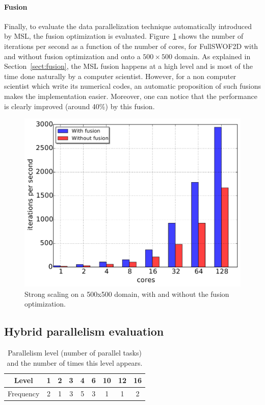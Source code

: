 \paragraph{\textbf{Fusion}} Finally, to evaluate the data parallelization technique automatically introduced by MSL, the fusion optimization is evaluated.
Figure~\ref{fig:fusion} shows the number of iterations per second as a function of the number of cores, for FullSWOF2D with and without fusion optimization and onto a $500 \times 500$ domain. As explained in Section~\ref{sect:fusion}, the MSL fusion happens at a high level and is most of the time done naturally by a computer scientist. However, for a non computer scientist which write its numerical codes, an automatic proposition of such fusions makes the implementation easier. Moreover, one can notice that the performance is clearly improved (around 40\%) by this fusion.

\begin{figure}[!h]\begin{center}
  \includegraphics[width=.6\textwidth]{../results/task_scaling/500_200/fusVSbase.pdf}
  \caption{Strong scaling on a 500x500 domain, with and without the fusion optimization.}
  \label{fig:fusion}
\end{center}\end{figure}

\subsection{Hybrid parallelism evaluation}

\begin{table}[th]
 \begin{center}
 \begin{tabular}{|c|c|c|c|c|c|c|c|c|}
    \hline 
   Level & 1 & 2 & 3 & 4 & 6 & 10 & 12 & 16\\
   \hline
   Frequency & 2 & 1 & 3 & 5 & 3 & 1 & 1 & 2\\
   \hline
 \end{tabular}
\caption{Parallelism level (number of parallel tasks) and the number of times this level appears.}
\label{fig:freq}
 \end{center}
\end{table}


